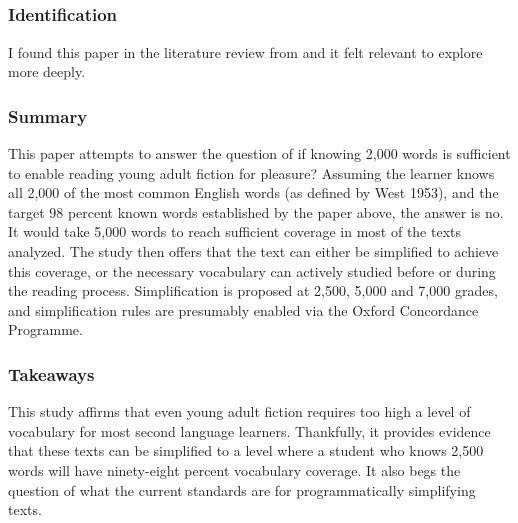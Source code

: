 \documentclass[
	letterpaper, %
]{jdf}
\begin{document}
\subsection{}
\subsubsection{Identification}
I found this paper in the literature review from \cite{hu_2000} and it felt relevant to explore more deeply.

\subsubsection{Summary}
This paper attempts to answer the question of if knowing 2,000 words is sufficient to enable reading young adult fiction for pleasure? Assuming the learner knows all 2,000 of the most common English words (as defined by West 1953), and the target 98 percent known words established by the paper above, the answer is no. It would take 5,000 words to reach sufficient coverage in most of the texts analyzed. The study then offers that the text can either be simplified to achieve this coverage, or the necessary vocabulary can actively studied before or during the reading process. Simplification is proposed at 2,500, 5,000 and 7,000 grades, and simplification rules are presumably enabled via the Oxford Concordance Programme.

\subsubsection{Takeaways}
This study affirms that even young adult fiction requires too high a level of vocabulary for most second language learners. Thankfully, it provides evidence that these texts can be simplified to a level where a student who knows 2,500 words will have ninety-eight percent vocabulary coverage. It also begs the question of what the current standards are for programmatically simplifying texts.
%
\subsection{}
\end{document}
